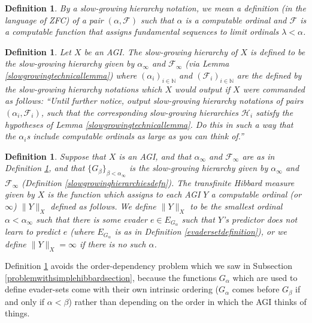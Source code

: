 \documentclass{article}
\newtheorem{definition}[theorem]{Definition}
\begin{document}
\begin{definition}
    By a \emph{slow-growing hierarchy notation}, we mean a
    definition (in the language of ZFC) of a pair $(\alpha,\mathcal F)$
    such that $\alpha$ is a computable ordinal and $\mathcal F$ is a computable
    function that assigns fundamental sequences to limit ordinals $\lambda<\alpha$.
\end{definition}

\begin{definition}
\label{slowgrowinghierarchyofanagidefn}
    Let $X$ be an AGI. The \emph{slow-growing hierarchy of $X$} is defined to be
    the slow-growing hierarchy given by $\alpha_\infty$ and $\mathcal F_\infty$
    (via Lemma \ref{slowgrowingtechnicallemma}) where $(\alpha_i)_{i\in\mathbb N}$
    and $(\mathcal F_i)_{i\in\mathbb N}$ are the defined by the
    slow-growing hierarchy notations which
    $X$ would output if $X$ were commanded as follows:
    ``Until further notice, output slow-growing hierarchy
    notations of pairs $(\alpha_i,\mathcal F_i)$, such that
    the corresponding slow-growing hierarchies $\mathcal H_i$ satisfy
    the hypotheses of Lemma \ref{slowgrowingtechnicallemma}. Do this in such a way
    that the $\alpha_i$s include computable ordinals as large as you can think of.''
\end{definition}

\begin{definition}
\label{transfinitehibbardmeasuredefn}
    Suppose that $X$ is an AGI, and that
    $\alpha_\infty$ and $\mathcal F_\infty$ are as in
    Definition \ref{slowgrowinghierarchyofanagidefn}, and that
    $\{G_\beta\}_{\beta<\alpha_\infty}$ is the slow-growing hierarchy
    given by $\alpha_\infty$ and $\mathcal F_\infty$
    (Definition \ref{slowgrowinghierarchiesdefn}).
    The \emph{transfinite Hibbard measure given by $X$} is
    the function which assigns to each AGI $Y$ a computable ordinal (or $\infty$)
    $\|Y\|_X$
    defined as follows.
    We define $\|Y\|_X$ to be the smallest ordinal $\alpha<\alpha_\infty$ such that
    there is some evader $e\in E_{G_\alpha}$ such that $Y$'s predictor does not
    learn to predict $e$ (where $E_{G_\alpha}$ is as in Definition \ref{evadersetdefinition}),
    or we define $\|Y\|_X=\infty$ if there is no such $\alpha$.
\end{definition}

Definition \ref{transfinitehibbardmeasuredefn} avoids the order-dependency problem which
we saw in Subsection \ref{problemwithsimplehibbardsection}, because the functions
$G_{\alpha}$ which are used to define evader-sets come with their own intrinsic ordering
($G_{\alpha}$ comes before $G_{\beta}$ if and only if $\alpha<\beta$) rather than
depending on the order in which the AGI thinks of things.
\end{document}
